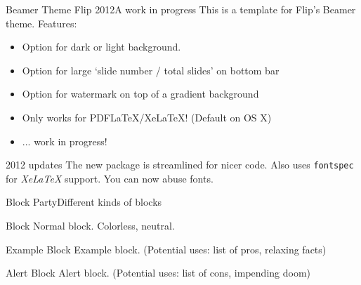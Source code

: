 \begin{frame}[c]{Beamer Theme Flip 2012}{A work in progress}
	This is a template for Flip's Beamer theme. Features:
	\begin{itemize}
		\item Option for dark or light background. 
		\\ 
		\normalsize
		\item Option for large `slide number / total slides' on bottom bar\\
		\item Option for watermark on top of a gradient background
		\item Only works for PDFLaTeX/XeLaTeX! (Default on OS X)
		\item ... work in progress! 
	\end{itemize}
	
	\begin{block}{2012 updates}
		The new package is streamlined for nicer code. Also uses \texttt{fontspec} for \textit{XeLaTeX} support. {You can now abuse fonts.}
	\end{block}
	
\end{frame}

\begin{frame}[c]{Block Party}{Different kinds of blocks}
	\begin{block}{Block}
		Normal block. Colorless, neutral.
	\end{block}

	\begin{exampleblock}{Example Block}
		Example block. (Potential uses: list of pros, relaxing facts)
	\end{exampleblock}

	\begin{alertblock}{Alert Block}
		Alert block. (Potential uses: list of cons, impending doom)
	\end{alertblock}
\end{frame}




